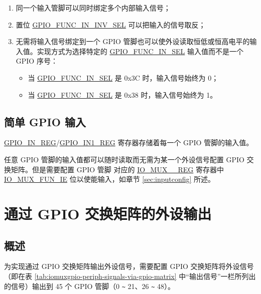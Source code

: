 \documentclass[main\_\_CN.tex]{subfiles}
\begin{document}
\begin{tiplisting}
\vspace{-2em}
\begin{enumerate}
\item \label{input-note-1} 同一个输入管脚可以同时绑定多个内部输入信号；
\item \label{input-note-2} 置位 \hyperref[fielddesc:GPIOFUNCNININVSEL]{GPIO\_FUNC\_IN\_INV\_SEL} 可以把输入的信号取反；
\item \label{input-note-3} 无需将输入信号绑定到一个 GPIO 管脚也可以使外设读取恒低或恒高电平的输入值。实现方式为选择特定的 \hyperref[fielddesc:GPIOFUNCNINSEL]{GPIO\_FUNC\_IN\_SEL} 输入值而不是一个 GPIO 序号：
\begin {itemize}
\item 当 \hyperref[fielddesc:GPIOFUNCNINSEL]{GPIO\_FUNC\_IN\_SEL} 是 0x{}3C 时，输入信号始终为 0；
\item 当 \hyperref[fielddesc:GPIOFUNCNINSEL]{GPIO\_FUNC\_IN\_SEL} 是 0x{}38 时，输入信号始终为 1。
\end{itemize}
\end{enumerate}
\end{tiplisting}


\subsection{简单 GPIO 输入}\label{IOMUXSimpleGPIOInput}

\hyperref[regdesc:GPIOINREG]{GPIO\_IN\_REG}/\hyperref[regdesc:GPIOIN1REG]{GPIO\_IN1\_REG} 寄存器存储着每一个 GPIO 管脚的输入值。

任意 GPIO 管脚的输入值都可以随时读取而无需为某一个外设信号配置 GPIO 交换矩阵。但是需要配置 GPIO 管脚  对应的 \hyperref[regdesc:IOMUXnREG]{IO\_MUX\_\_REG} 寄存器中 \hyperref[fielddesc:IOMUXFUNIE]{IO\_MUX\_FUN\_IE} 位以使能输入，如章节 \ref{sec:inputconfig} 所述。


\section{通过 GPIO 交换矩阵的外设输出}

\subsection{概述}

为实现通过 GPIO 交换矩阵输出外设信号，需要配置 GPIO 交换矩阵将外设信号（即在表 \ref{tab:iomuxgpio-periph-signals-via-gpio-matrix} 中“输出信号”一栏所列出的信号）输出到 45 个 GPIO 管脚（0 \verb+~+ 21、26 \verb+~+ 48）。
\end{document}
